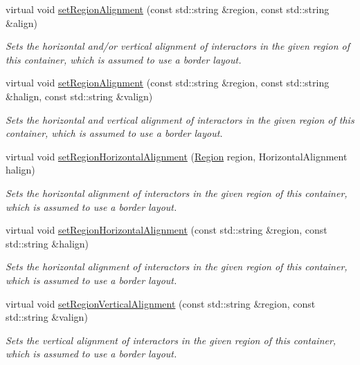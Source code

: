 \begin{DoxyCompactItemize}
virtual void \mbox{\hyperlink{classGContainer_ae4ff46516be9472498c0bf058b496e8b}{set\+Region\+Alignment}} (const std\+::string \&region, const std\+::string \&align)
\begin{DoxyCompactList}\small\item\em Sets the horizontal and/or vertical alignment of interactors in the given region of this container, which is assumed to use a border layout. \end{DoxyCompactList}\item 
virtual void \mbox{\hyperlink{classGContainer_ad1c76be81b3b865f78b0e91f0e1f07d4}{set\+Region\+Alignment}} (const std\+::string \&region, const std\+::string \&halign, const std\+::string \&valign)
\begin{DoxyCompactList}\small\item\em Sets the horizontal and vertical alignment of interactors in the given region of this container, which is assumed to use a border layout. \end{DoxyCompactList}\item 
virtual void \mbox{\hyperlink{classGContainer_aca8f01ef261afca9c843589e8be54134}{set\+Region\+Horizontal\+Alignment}} (\mbox{\hyperlink{classGContainer_a81a01a86de31071a92e6cce0bab9bc4b}{Region}} region, Horizontal\+Alignment halign)
\begin{DoxyCompactList}\small\item\em Sets the horizontal alignment of interactors in the given region of this container, which is assumed to use a border layout. \end{DoxyCompactList}\item 
virtual void \mbox{\hyperlink{classGContainer_aefb97090ff4e149f8a0cce9efee3c451}{set\+Region\+Horizontal\+Alignment}} (const std\+::string \&region, const std\+::string \&halign)
\begin{DoxyCompactList}\small\item\em Sets the horizontal alignment of interactors in the given region of this container, which is assumed to use a border layout. \end{DoxyCompactList}\item 
virtual void \mbox{\hyperlink{classGContainer_afbe22d897ce8ef25db52cbc3d456aa0a}{set\+Region\+Vertical\+Alignment}} (const std\+::string \&region, const std\+::string \&valign)
\begin{DoxyCompactList}\small\item\em Sets the vertical alignment of interactors in the given region of this container, which is assumed to use a border layout. \end{DoxyCompactList}\item 

\end{DoxyCompactItemize}
